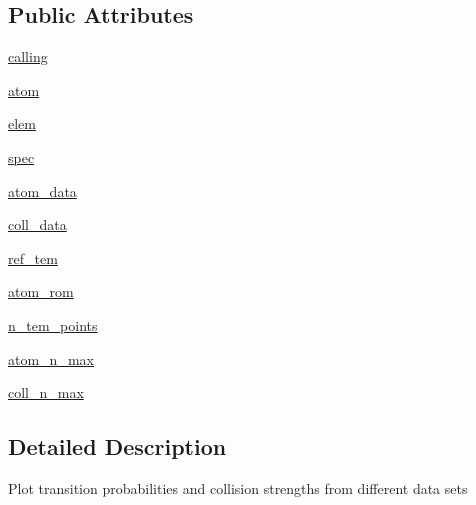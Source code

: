 \subsection*{Public Attributes}
\begin{DoxyCompactItemize}
\item 
\hyperlink{classpyneb_1_1plot_1_1plot_atomic_data_1_1_data_plot_ab25fa7ebe84b603684dee62410c1e34c}{calling}
\item 
\hyperlink{classpyneb_1_1plot_1_1plot_atomic_data_1_1_data_plot_a0c5c7091b1d8a95d9bee2744d713f5c9}{atom}
\item 
\hyperlink{classpyneb_1_1plot_1_1plot_atomic_data_1_1_data_plot_a62e73dc66c7aff7941c5ce94e808c23a}{elem}
\item 
\hyperlink{classpyneb_1_1plot_1_1plot_atomic_data_1_1_data_plot_adaf1b66faf18504ec4b5c8c0b7f6763b}{spec}
\item 
\hyperlink{classpyneb_1_1plot_1_1plot_atomic_data_1_1_data_plot_adbc6d7a21be11f88119d2df92b7669de}{atom\-\_\-data}
\item 
\hyperlink{classpyneb_1_1plot_1_1plot_atomic_data_1_1_data_plot_aa561ae44595ada3e8abc919e7eb658c6}{coll\-\_\-data}
\item 
\hyperlink{classpyneb_1_1plot_1_1plot_atomic_data_1_1_data_plot_a18c0d88f53a02c76deb40d357e3130d5}{ref\-\_\-tem}
\item 
\hyperlink{classpyneb_1_1plot_1_1plot_atomic_data_1_1_data_plot_a6bb4027912dbb4908acddc15fd10900c}{atom\-\_\-rom}
\item 
\hyperlink{classpyneb_1_1plot_1_1plot_atomic_data_1_1_data_plot_a173ab0637c9bd1f4f3bca204f5842e93}{n\-\_\-tem\-\_\-points}
\item 
\hyperlink{classpyneb_1_1plot_1_1plot_atomic_data_1_1_data_plot_a9d8384d6e40ef24c8b63f316c53e4c69}{atom\-\_\-n\-\_\-max}
\item 
\hyperlink{classpyneb_1_1plot_1_1plot_atomic_data_1_1_data_plot_a0c40e76d4f964382eb26f279b631c956}{coll\-\_\-n\-\_\-max}
\end{DoxyCompactItemize}


\subsection{Detailed Description}
\begin{DoxyVerb}Plot transition probabilities and collision strengths from different data sets\end{DoxyVerb}
 

